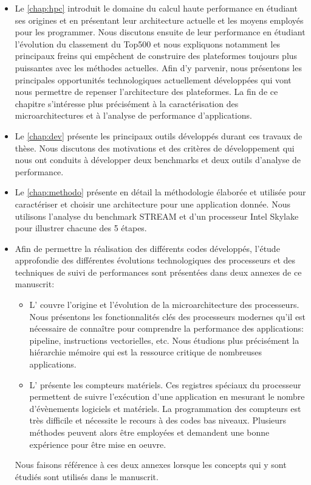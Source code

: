         \begin{itemize}
        
            \item Le \autoref{chap:hpc} introduit le domaine du calcul haute performance en étudiant ses origines et en présentant leur architecture actuelle et les moyens employés pour les programmer. Nous discutons ensuite de leur performance en étudiant l'évolution du classement du Top500 et nous expliquons notamment les principaux freins qui empêchent de construire des plateformes toujours plus puissantes avec les méthodes actuelles. Afin d'y parvenir, nous présentons les principales opportunités technologiques actuellement développées qui vont nous permettre de repenser l'architecture des plateformes. La fin de ce chapitre s'intéresse plus précisément à la caractérisation des microarchitectures et à l'analyse de performance d'applications.
        
            \item Le \autoref{chap:dev} présente les principaux outils développés durant ces travaux de thèse. Nous discutons des motivations et des critères de développement qui nous ont conduits à développer deux benchmarks et deux outils d'analyse de performance.
        
            \item Le \autoref{chap:methodo} présente en détail la méthodologie élaborée et utilisée pour caractériser et choisir une architecture pour une application donnée. Nous utilisons l'analyse du benchmark STREAM et d'un processeur Intel Skylake pour illustrer chacune des 5 étapes.
        
            \item Afin de permettre la réalisation des différents codes développés, l'étude approfondie des différentes évolutions technologiques des processeurs et des techniques de suivi de performances sont présentées dans deux annexes de ce manuscrit:
            \begin{itemize}
                \item L' couvre l'origine et l'évolution de la microarchitecture des processeurs. Nous présentons les fonctionnalités clés des processeurs modernes qu'il est nécessaire de connaître pour comprendre la performance des applications: pipeline, instructions vectorielles, etc. Nous étudions plus précisément la hiérarchie mémoire qui est la ressource critique de nombreuses applications. 
                
                \item L' présente les compteurs matériels. Ces registres spéciaux du processeur permettent de suivre l'exécution d'une application en mesurant le nombre d'évènements logiciels et matériels. La programmation des compteurs est très difficile et nécessite le recours à des codes bas niveaux. Plusieurs méthodes peuvent alors être employées et demandent une bonne expérience pour être mise en oeuvre.
            \end{itemize}
            Nous faisons référence à ces deux annexes lorsque les concepts qui y sont étudiés sont utilisés dans le manuscrit.
        
        \end{itemize}
